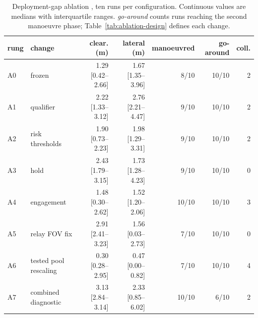 
\begin{table}[t]
\centering
\caption{Deployment-gap ablation \diagmark, ten runs per configuration.
Continuous values are medians with interquartile ranges. \emph{go-around}
counts runs reaching the second manoeuvre phase; Table~\ref{tab:ablation-design}
defines each change.}
\label{tab:ablation}
\scriptsize
\setlength{\tabcolsep}{2.5pt}
\begin{tabular}{llrrrrr}
\toprule
rung & change & clear. (\si{\metre}) & lateral (\si{\metre})
& manoeuvred & go-around & coll. \\
\midrule
A0 & frozen & 1.29 \tiny[0.42--2.66] & 1.67 \tiny[1.35--3.96] & 8/10 & 10/10 & 2 \\
A1 & qualifier & 2.22 \tiny[1.33--3.12] & 2.76 \tiny[2.21--4.47] & 9/10 & 10/10 & 2 \\
A2 & risk thresholds & 1.90 \tiny[0.73--2.23] & 1.98 \tiny[1.29--3.31] & 9/10 & 10/10 & 2 \\
A3 & hold & 2.43 \tiny[1.79--3.15] & 1.73 \tiny[1.28--4.23] & 9/10 & 10/10 & 0 \\
A4 & engagement & 1.48 \tiny[0.30--2.62] & 1.52 \tiny[1.20--2.06] & 10/10 & 10/10 & 3 \\
A5 & relay FOV fix & 2.91 \tiny[2.41--3.23] & 1.56 \tiny[0.03--2.73] & 7/10 & 10/10 & 0 \\
A6 & tested pool rescaling & 0.30 \tiny[0.28--2.95] & 0.47 \tiny[0.00--0.82] & 7/10 & 10/10 & 4 \\
A7 & combined diagnostic & 3.13 \tiny[2.84--3.14] & 2.33 \tiny[0.85--6.02] & 10/10 & 6/10 & 2 \\
\bottomrule
\end{tabular}
\end{table}
